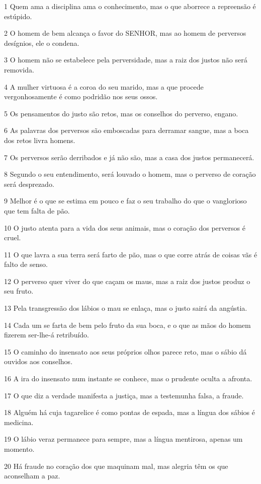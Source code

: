 \par 1 Quem ama a disciplina ama o conhecimento, mas o que aborrece a repreensão é estúpido.
\par 2 O homem de bem alcança o favor do SENHOR, mas ao homem de perversos desígnios, ele o condena.
\par 3 O homem não se estabelece pela perversidade, mas a raiz dos justos não será removida.
\par 4 A mulher virtuosa é a coroa do seu marido, mas a que procede vergonhosamente é como podridão nos seus ossos.
\par 5 Os pensamentos do justo são retos, mas os conselhos do perverso, engano.
\par 6 As palavras dos perversos são emboscadas para derramar sangue, mas a boca dos retos livra homens.
\par 7 Os perversos serão derribados e já não são, mas a casa dos justos permanecerá.
\par 8 Segundo o seu entendimento, será louvado o homem, mas o perverso de coração será desprezado.
\par 9 Melhor é o que se estima em pouco e faz o seu trabalho do que o vanglorioso que tem falta de pão.
\par 10 O justo atenta para a vida dos seus animais, mas o coração dos perversos é cruel.
\par 11 O que lavra a sua terra será farto de pão, mas o que corre atrás de coisas vãs é falto de senso.
\par 12 O perverso quer viver do que caçam os maus, mas a raiz dos justos produz o seu fruto.
\par 13 Pela transgressão dos lábios o mau se enlaça, mas o justo sairá da angústia.
\par 14 Cada um se farta de bem pelo fruto da sua boca, e o que as mãos do homem fizerem ser-lhe-á retribuído.
\par 15 O caminho do insensato aos seus próprios olhos parece reto, mas o sábio dá ouvidos aos conselhos.
\par 16 A ira do insensato num instante se conhece, mas o prudente oculta a afronta.
\par 17 O que diz a verdade manifesta a justiça, mas a testemunha falsa, a fraude.
\par 18 Alguém há cuja tagarelice é como pontas de espada, mas a língua dos sábios é medicina.
\par 19 O lábio veraz permanece para sempre, mas a língua mentirosa, apenas um momento.
\par 20 Há fraude no coração dos que maquinam mal, mas alegria têm os que aconselham a paz.
